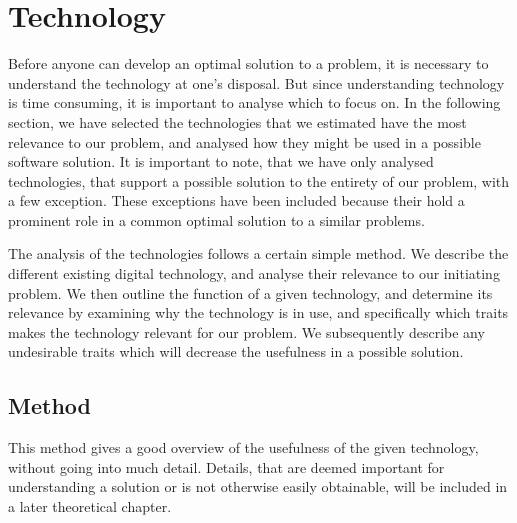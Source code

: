 
\section{Technology} \label{tech}


Before anyone can develop an optimal solution to a problem, it is necessary to understand the technology at one's disposal. But since understanding technology is time consuming, it is important to analyse which to focus on. In the following section, we have selected the technologies that we estimated have the most relevance to our problem, and analysed how they might be used in a possible software solution. It is important to note, that we have only analysed technologies, that support a possible solution to the entirety of our problem, with a few exception. These exceptions have been included because their hold a prominent role in a common optimal solution to a similar problems.

The analysis of the technologies follows a certain simple method. We describe the different existing digital technology, and analyse their relevance to our initiating problem. We then outline the function of a given technology, and determine its relevance by examining why the technology is in use, and specifically which traits makes the technology relevant for our problem. We subsequently describe any undesirable traits which will decrease the usefulness in a possible solution.

\subsection{Method} \label{sub:techmethod}
This method gives a good overview of the usefulness of the given technology, without going into much detail. Details, that are deemed important for understanding a solution or is not otherwise easily obtainable, will be included in a later theoretical chapter.




